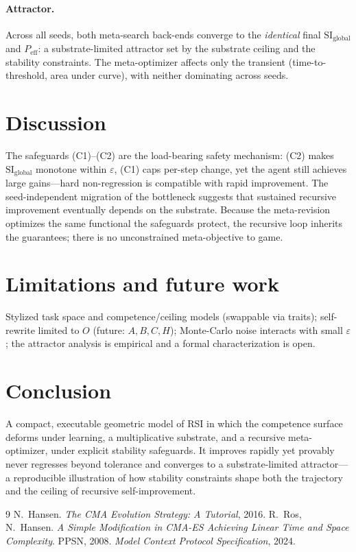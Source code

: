 \documentclass[11pt]{article}
\newcommand{\SI}{\mathrm{SI}_{\text{global}}}
\newcommand{\Peff}{P_{\text{eff}}}
\begin{document}
\paragraph{Attractor.} Across all seeds, both meta-search back-ends converge to
the \emph{identical} final $\SI$ and $\Peff$: a substrate-limited attractor set
by the substrate ceiling and the stability constraints. The meta-optimizer
affects only the transient (time-to-threshold, area under curve), with neither
dominating across seeds.

\section{Discussion}
The safeguards (C1)--(C2) are the load-bearing safety mechanism: (C2) makes
$\SI$ monotone within $\varepsilon$, (C1) caps per-step change, yet the agent
still achieves large gains---hard non-regression is compatible with rapid
improvement. The seed-independent migration of the bottleneck suggests that
sustained recursive improvement eventually depends on the substrate. Because the
meta-revision optimizes the same functional the safeguards protect, the
recursive loop inherits the guarantees; there is no unconstrained meta-objective
to game.

\section{Limitations and future work}
Stylized task space and competence/ceiling models (swappable via traits);
self-rewrite limited to $O$ (future: $A,B,C,H$); Monte-Carlo noise interacts
with small $\varepsilon$; the attractor analysis is empirical and a formal
characterization is open.

\section{Conclusion}
A compact, executable geometric model of RSI in which the competence surface
deforms under learning, a multiplicative substrate, and a recursive
meta-optimizer, under explicit stability safeguards. It improves rapidly yet
provably never regresses beyond tolerance and converges to a substrate-limited
attractor---a reproducible illustration of how stability constraints shape both
the trajectory and the ceiling of recursive self-improvement.

\begin{thebibliography}{9}
 N.\ Hansen. \emph{The CMA Evolution Strategy: A Tutorial}, 2016.
 R.\ Ros, N.\ Hansen. \emph{A Simple Modification in CMA-ES
Achieving Linear Time and Space Complexity}. PPSN, 2008.
 \emph{Model Context Protocol Specification}, 2024.
\end{thebibliography}
\end{document}
